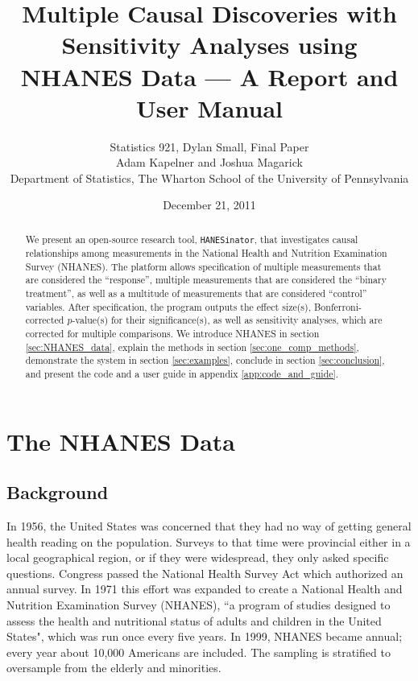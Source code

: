 \documentclass[12pt]{article}
\title{Multiple Causal Discoveries with Sensitivity Analyses using NHANES Data --- A Report and User Manual}
\author{Statistics 921, Dylan Small, Final Paper \\ Adam Kapelner and Joshua Magarick \\ \small{Department of Statistics, The Wharton School of the University of Pennsylvania}}
\date{December 21, 2011}
\begin{document}
\maketitle


\begin{abstract}
We present an open-source research tool, \texttt{HANESinator}, that investigates causal relationships among measurements in the National Health and Nutrition Examination Survey (NHANES). The platform allows specification of multiple measurements that are considered the ``response'', multiple measurements that are considered the ``binary treatment'', as well as a multitude of measurements that are considered ``control'' variables. After specification, the program outputs the effect size(s), Bonferroni-corrected $p$-value(s) for their significance(s), as well as sensitivity analyses, which are corrected for multiple comparisons. We introduce NHANES in section \ref{sec:NHANES_data}, explain the methods in section \ref{sec:one_comp_methods}, demonstrate the system in section \ref{sec:examples}, conclude in section \ref{sec:conclusion}, and present the code and a user guide in appendix \ref{app:code_and_guide}.
\end{abstract}

\section{The NHANES Data}\label{sec:NHANES_data}

\subsection{Background}

In 1956, the United States was concerned that they had no way of getting general health reading on the population. Surveys to that time were provincial either in a local geographical region, or if they were widespread, they only asked specific questions. Congress passed the National Health Survey Act which authorized an annual survey. In 1971 this effort was expanded to create a National Health and Nutrition Examination Survey (NHANES), ``a program of studies designed to assess the health and nutritional status of adults and children in the United States", which was run once every five years. In 1999, NHANES became annual; every year about 10,000 Americans are included. The sampling is stratified to oversample from the elderly and minorities. 
\end{document}
